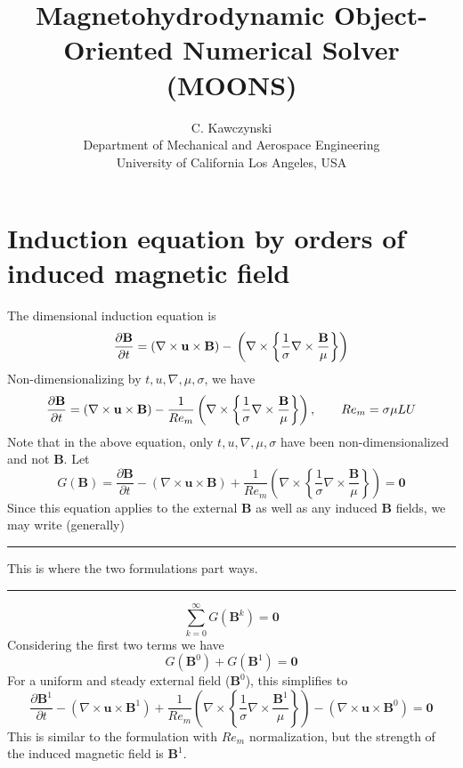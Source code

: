 \documentclass[11pt]{article}
\newcommand{\B}{\mathbf{B}}
\newcommand{\U}{\mathbf{u}}
\newcommand{\PD}{\partial}
\begin{document}
\doublespacing
\title{Magnetohydrodynamic Object-Oriented Numerical Solver (MOONS)}
\author{C. Kawczynski \\
Department of Mechanical and Aerospace Engineering \\
University of California Los Angeles, USA\\
}
\section{Induction equation by orders of induced magnetic field}
The dimensional induction equation is
\begin{equation} \label{eq:ind_dim}
  \frac{\PD \B}{\PD t} 
  =
  (\nabla \times \U \times \B)
  - \\
  \left(
  \nabla \times
  \left\{
  \frac{1}{\sigma}
  \nabla \times
  \frac{\B}{\mu}
  \right\}
  \right)
\end{equation}
Non-dimensionalizing by $t,u,\nabla , \mu, \sigma$, we have
\begin{equation} \label{eq:ind}
  \frac{\PD \B}{\PD t} 
  =
  (\nabla \times \U \times \B)
  - \\
  \frac{1}{Re_m}
  \left(
  \nabla \times
  \left\{
  \frac{1}{\sigma}
  \nabla \times
  \frac{\B}{\mu}
  \right\}
  \right)
  ,\qquad Re_m = \sigma \mu LU
\end{equation}
Note that in the above equation, only $t,u,\nabla , \mu, \sigma$ have been non-dimensionalized and not $\B$. Let
\begin{equation}
  G(\B)
  =
  \frac{\PD \B}{\PD t} 
  -
  (\nabla \times \U \times \B)
  +
  \frac{1}{Re_m}
  \left(
  \nabla \times
  \left\{
  \frac{1}{\sigma}
  \nabla \times
  \frac{\B}{\mu}
  \right\}
  \right)
  =
  \mathbf{0}
\end{equation}
Since this equation applies to the external $\B$ as well as any induced $\B$ fields, we may write (generally)

\noindent
\rule{\textwidth}{1pt}
\begin{center}
This is where the two formulations part ways.
\end{center}
\noindent
\rule{\textwidth}{1pt}
\begin{equation}
	\sum_{k=0}^{\infty} G(\B^k) = \mathbf{0}
\end{equation}
Considering the first two terms we have
\begin{equation}
  G(\B^0) + G(\B^1) = \mathbf{0}
\end{equation}
For a uniform and steady external field ($\B^0$), this simplifies to
\begin{equation}
  \frac{\PD \B^1}{\PD t} 
  -
  (\nabla \times \U \times \B^1)
  +
  \frac{1}{Re_m}
  \left(
  \nabla \times
  \left\{
  \frac{1}{\sigma}
  \nabla \times
  \frac{\B^1}{\mu}
  \right\}
  \right)
  -
  (\nabla \times \U \times \B^0)
  =
  \mathbf{0}
\end{equation}
This is similar to the formulation with $Re_m$ normalization, but the strength of the induced magnetic field is $\B^1$.
\end{document}

